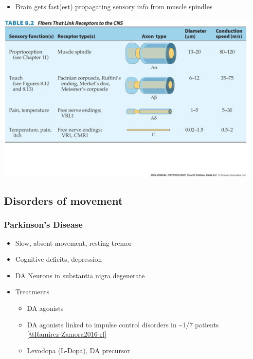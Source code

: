 \documentclass[
  letterpaper,
  DIV=11,
  numbers=noendperiod]{scrartcl}
\providecommand{\tightlist}{%
  \setlength{\itemsep}{0pt}\setlength{\parskip}{0pt}}\usepackage{longtable,booktabs,array}
\begin{document}
\begin{itemize}
\tightlist
\item
  Brain gets fast(est) propagating sensory info from muscle spindles
\end{itemize}

\begin{center}
\includegraphics{../include/img/axon-size-speed-tradeoff.jpg}
\end{center}

\subsection{Disorders of movement}\label{disorders-of-movement}

\subsubsection{Parkinson's Disease}\label{parkinsons-disease}

\begin{itemize}
\tightlist
\item
  Slow, absent movement, resting tremor
\item
  Cognitive deficits, depression
\item
  DA Neurons in substantia nigra degenerate
\item
  Treatments

  \begin{itemize}
  \tightlist
  \item
    DA agonists
  \item
    DA agonists linked to impulse control disorders in
    \textasciitilde1/7 patients
    \href{http://doi.org/10.1586/14737175.2016.1158103}{{[}@Ramirez-Zamora2016-rl{]}}
  \item
    Levodopa (L-Dopa), DA precursor
  \end{itemize}
\end{itemize}
\end{document}
